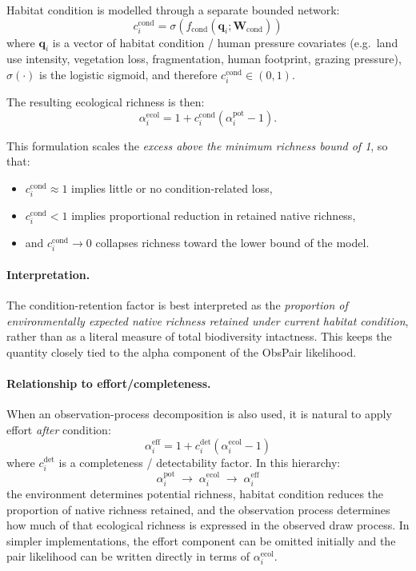 \documentclass{article}
\begin{document}
Habitat condition is modelled through a separate bounded network:
\begin{equation}
    c_i^{\mathrm{cond}}
    =
    \sigma\!\left(f_{\mathrm{cond}}(\mathbf{q}_i;\bm{W}_{\mathrm{cond}})\right)
\end{equation}
where \(\mathbf{q}_i\) is a vector of habitat condition / human pressure covariates (e.g.\ land use intensity, vegetation loss, fragmentation, human footprint, grazing pressure), \(\sigma(\cdot)\) is the logistic sigmoid, and therefore \(c_i^{\mathrm{cond}} \in (0,1)\).

The resulting ecological richness is then:
\begin{equation}
    \alpha_i^{\mathrm{ecol}}
    =
    1 + c_i^{\mathrm{cond}}
    \left(\alpha_i^{\mathrm{pot}} - 1\right).
    \label{eq:alpha-condition}
\end{equation}

This formulation scales the \emph{excess above the minimum richness bound of 1}, so that:
\begin{itemize}
    \item \(c_i^{\mathrm{cond}} \approx 1\) implies little or no condition-related loss,
    \item \(c_i^{\mathrm{cond}} < 1\) implies proportional reduction in retained native richness,
    \item and \(c_i^{\mathrm{cond}} \to 0\) collapses richness toward the lower bound of the model.
\end{itemize}

\paragraph{Interpretation.}
The condition-retention factor is best interpreted as the \emph{proportion of environmentally expected native richness retained under current habitat condition}, rather than as a literal measure of total biodiversity intactness. This keeps the quantity closely tied to the alpha component of the ObsPair likelihood.

\paragraph{Relationship to effort/completeness.}
When an observation-process decomposition is also used, it is natural to apply effort \emph{after} condition:
\begin{equation}
    \alpha_i^{\mathrm{eff}}
    =
    1 + c_i^{\mathrm{det}}
    \left(\alpha_i^{\mathrm{ecol}} - 1\right)
\end{equation}
where \(c_i^{\mathrm{det}}\) is a completeness / detectability factor. In this hierarchy:
\[
\alpha_i^{\mathrm{pot}}
\;\rightarrow\;
\alpha_i^{\mathrm{ecol}}
\;\rightarrow\;
\alpha_i^{\mathrm{eff}}
\]
the environment determines potential richness, habitat condition reduces the proportion of native richness retained, and the observation process determines how much of that ecological richness is expressed in the observed draw process. In simpler implementations, the effort component can be omitted initially and the pair likelihood can be written directly in terms of \(\alpha_i^{\mathrm{ecol}}\).
\end{document}
